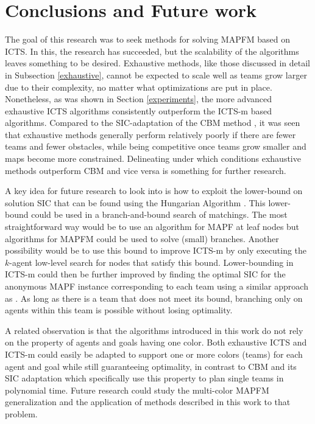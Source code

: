 \documentclass[english]{article}
\begin{document}
	\section{Conclusions and Future work}
	\label{conclusions}
	\label{future}
	The goal of this research was to seek methods for solving MAPFM based on ICTS. In this, the research has succeeded, but the scalability of the algorithms leaves something to be desired. Exhaustive methods, like those discussed in detail in Subsection \ref{exhaustive}, cannot be expected to scale well as teams grow larger due to their complexity, no matter what optimizations are put in place. Nonetheless, as was shown in Section \ref{experiments}, the more advanced exhaustive ICTS algorithms consistently outperform the ICTS-m based algorithms. Compared to the SIC-adaptation of the CBM method \cite{baauw2021}, it was seen that exhaustive methods generally perform relatively poorly if there are fewer teams and fewer obstacles, while being competitive once teams grow smaller and maps become more constrained. Delineating under which conditions exhaustive methods outperform CBM and vice versa is something for further research.
	
	A key idea for future research to look into is how to exploit the lower-bound on solution SIC that can be found using the Hungarian Algorithm \cite{kuhn55}. This lower-bound could be used in a branch-and-bound \cite{land1960} search of matchings. The most straightforward way would be to use an algorithm for MAPF at leaf nodes but algorithms for MAPFM could be used to solve (small) branches. Another possibility would be to use this bound to improve ICTS-m by only executing the $k$-agent low-level search for nodes that satisfy this bound. Lower-bounding in ICTS-m could then be further improved by finding the optimal SIC for the anonymous MAPF instance corresponding to each team using a similar approach as \cite{baauw2021}. As long as there is a team that does not meet its bound, branching only on agents within this team is possible without losing optimality.
	
	A related observation is that the algorithms introduced in this work do not rely on the property of agents and goals having one color. Both exhaustive ICTS and ICTS-m could easily be adapted to support one or more colors (teams) for each agent and goal while still guaranteeing optimality, in contrast to CBM \cite{ma2016} and its SIC adaptation \cite{baauw2021} which specifically use this property to plan single teams in polynomial time. Future research could study the multi-color MAPFM generalization and the application of methods described in this work to that problem. 
	
\end{document}
